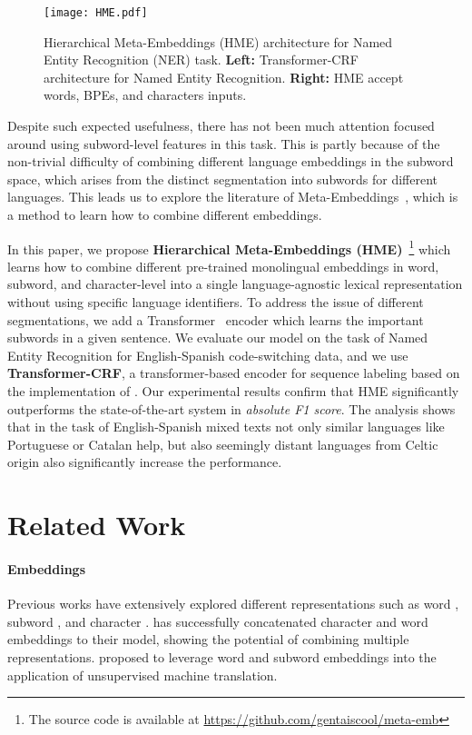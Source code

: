 \documentclass[11pt,a4paper]{article}
\begin{document}
\begin{figure*}[!t]
    \centering
    \texttt{[image: HME.pdf]}
    \caption{Hierarchical Meta-Embeddings (HME) architecture for Named Entity Recognition (NER) task. \textbf{Left:} Transformer-CRF architecture for Named Entity Recognition. \textbf{Right:} HME accept words, BPEs, and characters inputs.}
    \label{fig:model}
\end{figure*}

Despite such expected usefulness, there has not been much attention focused around using subword-level features in this task. 
This is partly because of the non-trivial difficulty of combining different language embeddings in the subword space, which arises from the distinct segmentation into subwords for different languages. 
This leads us to explore the literature of Meta-Embeddings~\cite{yin2016learning,muromagi2017linear,bollegala2018think,coates2018frustratingly,kiela2018dynamic,winata2019learning}, which is a method to learn how to combine different embeddings. 

In this paper, we propose \textbf{Hierarchical Meta-Embeddings (HME)}~\footnote{The source code is available at \url{https://github.com/gentaiscool/meta-emb}} which learns how to combine different pre-trained monolingual embeddings in word, subword, and character-level into a single language-agnostic lexical representation without using specific language identifiers. To address the issue of different segmentations, we add a Transformer~\cite{vaswani2017attention} encoder which learns the important subwords in a given sentence. We evaluate our model on the task of Named Entity Recognition for English-Spanish code-switching data, and we use  \textbf{Transformer-CRF}, a transformer-based encoder for sequence labeling based on the implementation of \citet{winata2019learning}.
Our experimental results confirm that HME significantly outperforms the state-of-the-art system in \textit{absolute F1 score}. The analysis shows that in the task of English-Spanish mixed texts not only similar languages like Portuguese or Catalan help, but also seemingly distant languages from Celtic origin also significantly increase the performance.

\section{Related Work}

\paragraph{Embeddings}
Previous works have extensively explored different representations such as word \cite{mikolov2013distributed,pennington2014glove,grave2018learning,xu2018emo2vec}, subword \cite{sennrich2016neural,heinzerling2018bpemb}, and character \cite{Santos2014LearningCR,wieting2016charagram}. 
\citet{lample2016neural} has successfully concatenated character and word embeddings to their model, showing the potential of combining multiple representations. \citet{liu-etal-2019-incorporating} proposed to leverage word and subword embeddings into the application of unsupervised machine translation.
\end{document}
